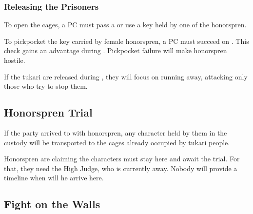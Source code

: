 


\subsubsection{Releasing the Prisoners}

To open the cages, a PC must pass a  or use a key held by one of the honorspren. 

To pickpocket the key carried by female honorspren, a PC must succeed on . This check gains an advantage during . Pickpocket failure will make honorspren hostile.

If the tukari are released during , they will focus on running away, attacking only those who try to stop them.

\subsection{Honorspren Trial}

If the party arrived to \locationFidelity{} with honorspren, any character held by them in the custody will be transported to the cages already occupied by tukari people.

Honorspren are claiming the characters must stay here and await the trial. For that, they need the High Judge, who is currently away. Nobody will provide a timeline when will he arrive here.




\newpage
\subsection{Fight on the Walls}
\label{ssec:unyieldingFidelityFight}

